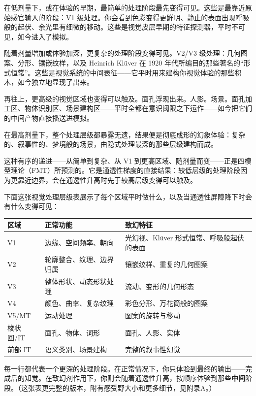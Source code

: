 \documentclass[11pt, twoside, openright]{book}
\begin{document}
在低剂量下，或在体验的早期，最简单的处理阶段最先变得可见。这些是最靠近原始感官输入的阶段：V1 级处理。你会看到色彩变得更鲜明、静止的表面出现呼吸般的起伏、余光里有细微的移动。这些是视觉皮层早期的特征探测器，平时不可见，如今进入了模拟。

随着剂量增加或体验加深，更复杂的处理阶段变得可见。V2/V3 级处理：几何图案、分形、镶嵌纹样，以及 Heinrich Klüver 在 1920 年代所编目的那些著名的“形式恒常”。这些是视觉系统的中间表征------它平时用来建构你视觉体验的那些积木，如今独立地显现了出来。

再往上，更高级的视觉区域也变得可以触及。面孔浮现出来。人影。场景。面孔加工区、物体识别区、场景建构区------平时全都在意识阈限之下运作------如今把它们的中间产物直接播送进模拟。

在最高剂量下，整个处理层级都暴露无遗，结果便是彻底成形的幻象体验：复杂的、叙事性的、梦境般的场景，由隐式处理最深的那些层级建构而成。

这种有序的递进------从简单到复杂、从 V1 到更高区域、随剂量而变------正是四模型理论（FMT）所预测的。它是通透性梯度的直接结果：较低层级的处理阶段因为更靠近边界，会在通透性升高时先于较高层级变得可以触及。

下面这张视觉处理层级表展示了每个区域平时做什么，以及当通透性屏障降下时会有什么变得可见：


{\small
\noindent
\begin{tabularx}{\linewidth}{X X X}
\toprule
\textbf{区域} & \textbf{正常功能} & \textbf{致幻特征} \\
\midrule
V1 & 边缘、空间频率、朝向 & 光幻视、Klüver 形式恒常、呼吸般起伏的表面 \\[4pt]
V2 & 轮廓整合、纹理、边界归属 & 镶嵌纹样、重复的几何图案 \\[4pt]
V3 & 整体形状、动态形状处理 & 流动、变形的几何形态 \\[4pt]
V4 & 颜色、曲率、复杂纹理 & 彩色分形、万花筒般的图案 \\[4pt]
V5/MT & 运动处理 & 图案的旋转与移动 \\[4pt]
梭状回/IT & 面孔、物体、词形 & 面孔、人影、实体 \\[4pt]
前部 IT & 语义类别、场景建构 & 完整的叙事性幻觉 \\[4pt]
\bottomrule
\end{tabularx}
}


每一行都代表一个更深的处理阶段。在正常情况下，你只体验到最终的输出------完成后的知觉。在致幻剂作用下，你则会随着通透性升高，按顺序体验到那些\textbf{中间}阶段。（这张表更完整的版本，附有感受野大小和更多细节，见附录A。）
\end{document}
